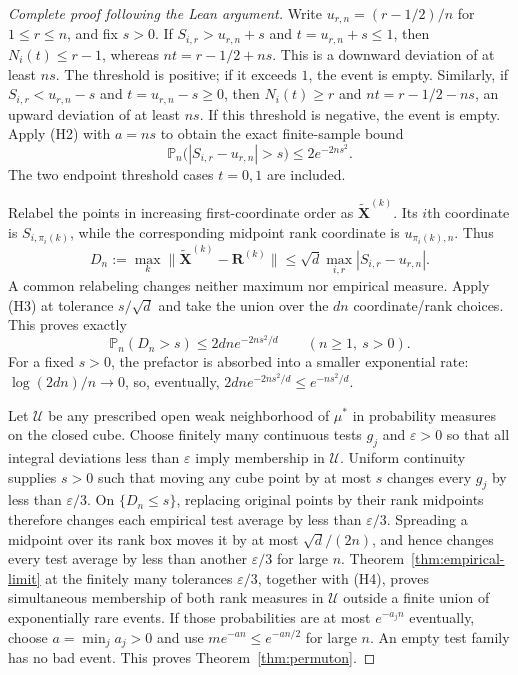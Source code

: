 \begin{proof}[Complete proof following the Lean argument]
Write $u_{r,n}=(r-1/2)/n$ for $1\le r\le n$, and fix $s>0$.
If $S_{i,r}>u_{r,n}+s$ and $t=u_{r,n}+s\le1$, then
$N_i(t)\le r-1$, whereas $nt=r-1/2+ns$.
This is a downward deviation of at least $ns$.
The threshold is positive; if it exceeds $1$, the event is empty.
Similarly, if $S_{i,r}<u_{r,n}-s$ and $t=u_{r,n}-s\ge0$, then
$N_i(t)\ge r$ and $nt=r-1/2-ns$, an upward deviation of at least $ns$.
If this threshold is negative, the event is empty.
Apply (H2) with $a=ns$ to obtain the exact finite-sample bound
\[
 \mathbb P_n\bigl(|S_{i,r}-u_{r,n}|>s\bigr)
                       \le2e^{-2ns^2}.        \tag{H3}
\]
The two endpoint threshold cases $t=0,1$ are included.

Relabel the points in increasing first-coordinate order as
$\widetilde{\mathbf X}^{(k)}$. Its $i$th coordinate is
$S_{i,\pi_i(k)}$, while the corresponding midpoint rank coordinate is
$u_{\pi_i(k),n}$. Thus
\[
 D_n:=\max_k\|\widetilde{\mathbf X}^{(k)}-\mathbf R^{(k)}\|
       \le\sqrt d\max_{i,r}|S_{i,r}-u_{r,n}|.
\]
A common relabeling changes neither maximum nor empirical measure.
Apply (H3) at tolerance $s/\sqrt d$ and take the union over the $dn$
coordinate/rank choices. This proves exactly
\[
       \mathbb P_n(D_n>s)\le2dn e^{-2ns^2/d}
       \qquad(n\ge1,\ s>0).                  \tag{H4}
\]
For a fixed $s>0$, the prefactor is absorbed into a smaller exponential
rate: $\log(2dn)/n\to0$, so, eventually,
$2dn e^{-2ns^2/d}\le e^{-ns^2/d}$.

Let $\mathcal U$ be any prescribed open weak neighborhood of $\mu^\ast$
in probability measures on the closed cube. Choose finitely many
continuous tests $g_j$ and $\varepsilon>0$ so that all integral
deviations less than $\varepsilon$ imply membership in $\mathcal U$.
Uniform continuity supplies $s>0$ such that moving any cube point by at
most $s$ changes every $g_j$ by less than $\varepsilon/3$.
On $\{D_n\le s\}$, replacing original points by their rank midpoints
therefore changes each empirical test average by less than
$\varepsilon/3$.
Spreading a midpoint over its rank box moves it by at most
$\sqrt d/(2n)$, and hence changes every test average by less than another
$\varepsilon/3$ for large $n$.
Theorem~\ref{thm:empirical-limit} at the finitely many tolerances
$\varepsilon/3$, together with (H4), proves simultaneous membership of
both rank measures in $\mathcal U$ outside a finite union of exponentially
rare events. If those probabilities are at most $e^{-a_j n}$ eventually,
choose $a=\min_j a_j>0$ and use $m e^{-an}\le e^{-an/2}$ for large $n$.
An empty test family has no bad event.
This proves Theorem~\ref{thm:permuton}.


\end{proof}
